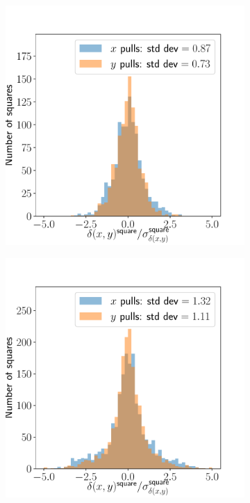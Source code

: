 \documentclass{article}
\begin{document}
\begin{figure}[ht]
	\centering
	\begin{subfigure}{0.32\linewidth}
		\includegraphics[width=\linewidth]{squarepull1.pdf}
		\caption{}
		\label{fig:squarepull1}
	\end{subfigure}
	\begin{subfigure}{0.32\linewidth}
		\includegraphics[width=\linewidth]{squarepull2.pdf}

\end{subfigure}
\end{figure}
\end{document}
